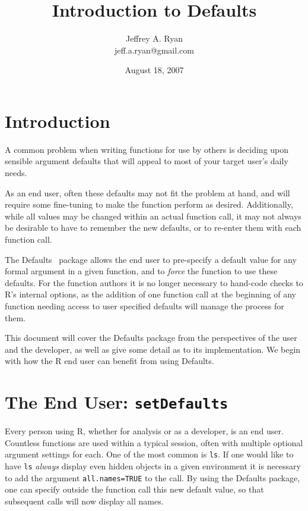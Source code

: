 \documentclass{article}
\title{\bf Introduction to Defaults }
\author{Jeffrey A. Ryan \\
       jeff.a.ryan@gmail.com}
\date{August 18, 2007}
\begin{document}
\maketitle
\tableofcontents

\section{Introduction}
A common problem when writing functions
for use by others is deciding upon sensible
argument defaults that will appeal to most of
your target user's daily  needs.

\vspace{3mm}
\noindent
As an end user, often these defaults may not fit
the problem at hand, and will require some fine-tuning
to make the function perform as desired.  Additionally,
while all 
values may be changed within an actual
function call, it may not always be desirable to
have to remember the new defaults, or to re-enter
them with each function call.

\vspace{3mm}
\noindent
The {\sf Defaults}~\cite{p} package allows the end user
to pre-specify a default value for any formal argument
in a given function, and to {\em force} the function
to use these defaults. For the function authors it
is no longer necessary to hand-code checks to
{\sf R}'s internal {\sf options}, as the addition
of one function call at the beginning of any function
needing access to user specified defaults will 
manage the process for them. 

\vspace{3mm}
\noindent
This document will cover the {\sf Defaults} package
from the perspectives of the user and the developer,
as well as give some detail as to its implementation. We begin
with how the {\sf R} end user can benefit from using
{\sf Defaults}.


\section{The End User: {\tt setDefaults} }
Every person using R, whether for analysis or as a
developer, is an end user. Countless functions
are used within a typical session, often with
multiple optional argument settings for each.
One of the most common is {\tt ls}. If one would like
to have {\tt ls} {\em always} display even hidden objects in a given environment
it is necessary to add the argument {\tt all.names=TRUE} to the call.
By using the {\sf Defaults} package, one can specify outside the function call this
new default value, so that subsequent calls will now display all
names.
\end{document}

